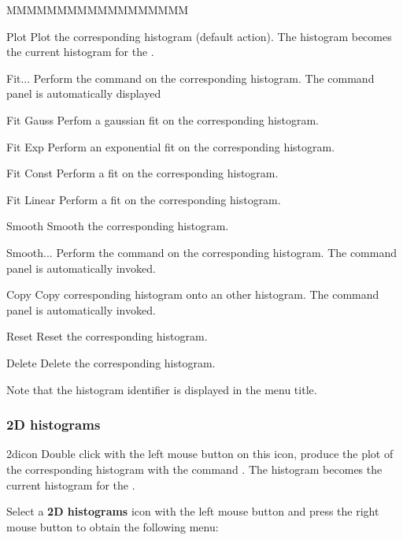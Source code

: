 \begin{DLsf}{MMMMMMMMMMMMMMMMMM}
\item[Plot]         Plot the corresponding histogram (default action). The
                    histogram becomes the current histogram for the \HSP.
\item[Fit...]       Perform the command  on the corresponding
                    histogram. The command panel is automatically displayed
\item[Fit Gauss]    Perfom a gaussian fit on the corresponding histogram.
\item[Fit Exp]      Perform an exponential fit on the corresponding histogram.
\item[Fit Const]    Perform a  fit on the corresponding histogram.
\item[Fit Linear]   Perform a  fit on the corresponding histogram.
\item[Smooth]       Smooth the corresponding histogram.
\item[Smooth...]    Perform the command  on the corresponding
                    histogram. The command panel is automatically invoked.
\item[Copy ]        Copy corresponding histogram onto an other histogram.
                    The command panel is automatically invoked.
\item[Reset ]       Reset the corresponding histogram.
\item[Delete]       Delete the corresponding histogram.
\end{DLsf}

Note that the histogram identifier is displayed in the menu title.


\subsubsection{2D histograms}
\begin{ICON}{2dicon}
Double click with the left mouse button on this icon, produce the plot of the
corresponding histogram with the command  . The histogram
becomes the current histogram for the \HSP.
\end{ICON}

Select a {\bf 2D histograms} icon with the left mouse button and press
the right mouse button to obtain the following menu:


